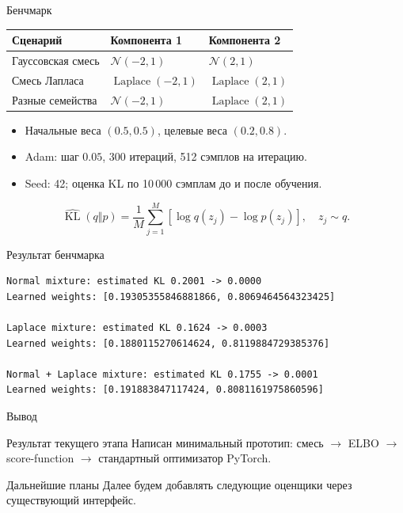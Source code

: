 \documentclass[aspectratio=169]{beamer}
\newcommand{\KL}{\operatorname{KL}}
\begin{document}
\begin{frame}{Бенчмарк}
  \begin{center}
    \begin{tabular}{lll}
      \toprule
      Сценарий & Компонента 1 & Компонента 2 \\
      \midrule
      Гауссовская смесь & $\mathcal N(-2,1)$ & $\mathcal N(2,1)$ \\
      Смесь Лапласа & $\operatorname{Laplace}(-2,1)$ & $\operatorname{Laplace}(2,1)$ \\
      Разные семейства & $\mathcal N(-2,1)$ & $\operatorname{Laplace}(2,1)$ \\
      \bottomrule
    \end{tabular}
  \end{center}
  \begin{itemize}
    \item Начальные веса $(0.5,0.5)$, целевые веса $(0.2,0.8)$.
    \item Adam: шаг $0.05$, 300 итераций, 512 сэмплов на итерацию.
    \item Seed: 42; оценка KL по 10\,000 сэмплам до и после обучения.
  \end{itemize}
  \[
    \widehat{\KL}(q\Vert p)
      =\frac1M\sum_{j=1}^M[\log q(z_j)-\log p(z_j)],\quad z_j\sim q.
  \]
\end{frame}

\begin{frame}[fragile]{Результат бенчмарка}
  \begin{lstlisting}
Normal mixture: estimated KL 0.2001 -> 0.0000
Learned weights: [0.19305355846881866, 0.8069464564323425]

Laplace mixture: estimated KL 0.1624 -> 0.0003
Learned weights: [0.1880115270614624, 0.8119884729385376]

Normal + Laplace mixture: estimated KL 0.1755 -> 0.0001
Learned weights: [0.191883847117424, 0.8081161975860596]
  \end{lstlisting}
\end{frame}

\begin{frame}{Вывод}
  \begin{block}{Результат текущего этапа}
    Написан минимальный прототип: смесь $\to$ ELBO $\to$ score-function $\to$ стандартный оптимизатор PyTorch.
  \end{block}
  
  \begin{block}{Дальнейшие планы}
  Далее будем добавлять следующие оценщики через существующий интерфейс.
  \end{block}
\end{frame}
\end{document}
